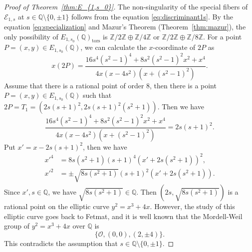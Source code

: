 \documentclass[main]{subfiles}
\begin{document}
\begin{proof}[Proof of Theorem~{\ref{thm:E_{1,s_0}}}]
    The non-singularity of the special fibers of $\mathcal{E}_{1,s}$ at $s \in \mathbb{Q} \setminus \{0,\pm 1 \}$ follows from the equation \eqref{eq:discriminant1s}.
    By the equation \eqref{eq:specialization} and Mazur's Theorem (Theorem~\ref{thm:mazur}), the only possibility of $E_{1,s_0}(\mathbb{Q})_{\text{tors}}$ is $\mathbb{Z} / 2 \mathbb{Z} \oplus \mathbb{Z} / 4 \mathbb{Z}$ or $\mathbb{Z} / 2 \mathbb{Z} \oplus \mathbb{Z} / 8 \mathbb{Z}$.
    For a point $P=(x,y) \in E_{1,s_0}(\mathbb{Q})$, we can calculate the $x$-coordinate of $2P$ as
    \begin{equation*}
        x(2P) = \frac{16s^{4}(s^{2} - 1)^{4} + 8 s^{2}(s^{2} - 1)^{2} x^{2} + x^{4}}{4 x (x - 4s^{2}) (x + (s^{2} - 1)^{2})}.
    \end{equation*}
    Assume that there is a rational point of order $8$, then there is a point $P=(x,y) \in E_{1,s_0}(\mathbb{Q})$ such that $2P = T_1 = (2s(s+1)^2, 2s(s+1)^2(s^2+1))$.
    Then we have
    \begin{equation*}
        \frac{16s^{4}(s^{2} - 1)^{4} + 8 s^{2}(s^{2} - 1)^{2} x^{2} + x^{4}}{4 x (x - 4s^{2}) (x + (s^{2} - 1)^{2})} = 2s(s + 1)^{2}.
    \end{equation*}
    Put $x' = x - 2s(s+1)^2$, then we have
    \begin{align*}
        x'^4 & = 8s(s^{2} + 1)(s + 1)^{4}(x' + 2s(s^2+1))^{2},        \\
        x'^2 & = \pm \sqrt{8 s (s^2 + 1)} (s+1)^{2} (x' + 2s(s^2+1)).
    \end{align*}
    Since $x', s \in \mathbb{Q}$, we have $\sqrt{8 s (s^2 + 1)} \in \mathbb{Q}$.
    Then $(2s, \sqrt{8 s (s^2 + 1)})$ is a rational point on the elliptic curve $y^2 = x^3 + 4x$.
    However, the study of this elliptic curve goes back to Fetmat, and it is well known that the Mordell-Weil group of $y^2 = x^3 + 4x$ over $\mathbb{Q}$ is
    \begin{equation*}
        \{\mathcal{O}, (0,0), (2,\pm 4) \}.
    \end{equation*}
    This contradicts the assumption that $s \in \mathbb{Q} \setminus \{0,\pm 1 \}$.
\end{proof}
\end{document}
